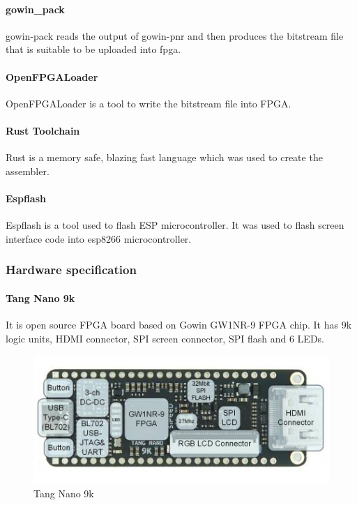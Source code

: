 \documentclass[a4paper,12pt]{article}
\begin{document}
    \paragraph{gowin\_pack}
    gowin-pack reads the output of gowin-pnr and then produces the bitstream file that is suitable to be uploaded into fpga.

    \paragraph{OpenFPGALoader}
    OpenFPGALoader is a tool to write the bitstream file into FPGA.

    \paragraph{Rust Toolchain}
    Rust is a memory safe, blazing fast language which was used to create the assembler.

    \paragraph{Espflash}
    Espflash is a tool used to flash ESP microcontroller. It was used to flash screen interface code into esp8266 microcontroller.

    \subsubsection{Hardware specification}

    \paragraph{Tang Nano 9k}
    It is open source FPGA board based on Gowin GW1NR-9 FPGA chip. It has 9k logic units, HDMI connector, SPI screen connector, SPI flash and 6 LEDs.

    \begin{figure}[H]
        \centering
        \includegraphics{./images/fpga.jpg}
        \caption{Tang Nano 9k}
    \end{figure}
\end{document}
